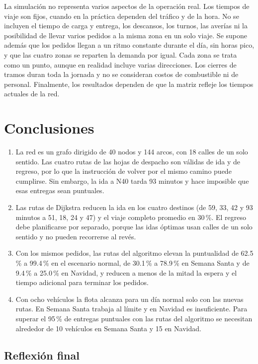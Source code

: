 \documentclass[11pt,letterpaper]{article}
\begin{document}
La simulación no representa varios aspectos de la operación real. Los tiempos de viaje son fijos, cuando en la práctica dependen del tráfico y de la hora. No se incluyen el tiempo de carga y entrega, los descansos, los turnos, las averías ni la posibilidad de llevar varios pedidos a la misma zona en un solo viaje. Se supone además que los pedidos llegan a un ritmo constante durante el día, sin horas pico, y que las cuatro zonas se reparten la demanda por igual. Cada zona se trata como un punto, aunque en realidad incluye varias direcciones. Los cierres de tramos duran toda la jornada y no se consideran costos de combustible ni de personal. Finalmente, los resultados dependen de que la matriz refleje los tiempos actuales de la red.

\section{Conclusiones}

\begin{enumerate}
  \item La red es un grafo dirigido de 40 nodos y 144 arcos, con 18 calles de un solo sentido. Las cuatro rutas de las hojas de despacho son válidas de ida y de regreso, por lo que la instrucción de volver por el mismo camino puede cumplirse. Sin embargo, la ida a N40 tarda 93 minutos y hace imposible que esas entregas sean puntuales.
  \item Las rutas de Dijkstra reducen la ida en los cuatro destinos (de 59, 33, 42 y 93 minutos a 51, 18, 24 y 47) y el viaje completo promedio en 30\,\%. El regreso debe planificarse por separado, porque las idas óptimas usan calles de un solo sentido y no pueden recorrerse al revés.
  \item Con los mismos pedidos, las rutas del algoritmo elevan la puntualidad de 62.5\,\% a 99.4\,\% en el escenario normal, de 30.1\,\% a 78.9\,\% en Semana Santa y de 9.4\,\% a 25.0\,\% en Navidad, y reducen a menos de la mitad la espera y el tiempo adicional para terminar los pedidos.
  \item Con ocho vehículos la flota alcanza para un día normal solo con las nuevas rutas. En Semana Santa trabaja al límite y en Navidad es insuficiente. Para superar el 95\,\% de entregas puntuales con las rutas del algoritmo se necesitan alrededor de 10 vehículos en Semana Santa y 15 en Navidad.
\end{enumerate}

\subsection*{Reflexión final}
\end{document}
